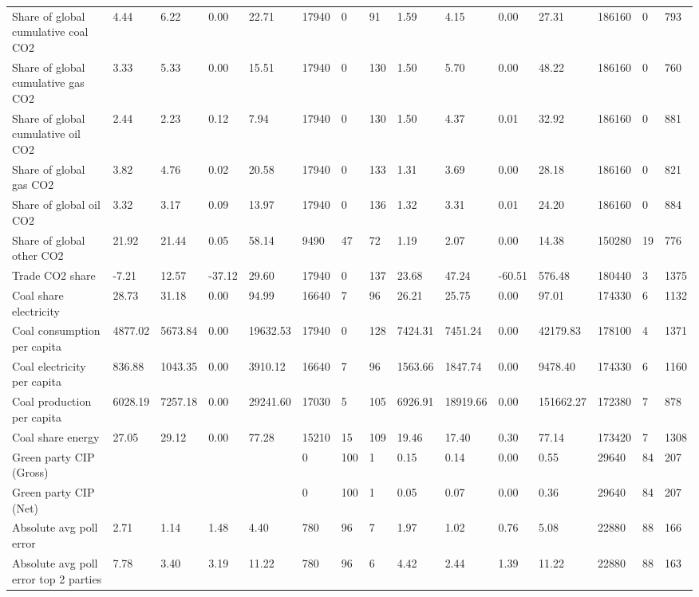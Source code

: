 \begin{longtable}{lllllllllllllll}
Share of global cumulative coal CO2 & 4.44 & 6.22 & 0.00 & 22.71 & 17940 & 0 & 91 & 1.59 & 4.15 & 0.00 & 27.31 & 186160 & 0 & 793\\
Share of global cumulative gas CO2 & 3.33 & 5.33 & 0.00 & 15.51 & 17940 & 0 & 130 & 1.50 & 5.70 & 0.00 & 48.22 & 186160 & 0 & 760\\
Share of global cumulative oil CO2 & 2.44 & 2.23 & 0.12 & 7.94 & 17940 & 0 & 130 & 1.50 & 4.37 & 0.01 & 32.92 & 186160 & 0 & 881\\
\addlinespace
Share of global gas CO2 & 3.82 & 4.76 & 0.02 & 20.58 & 17940 & 0 & 133 & 1.31 & 3.69 & 0.00 & 28.18 & 186160 & 0 & 821\\
Share of global oil CO2 & 3.32 & 3.17 & 0.09 & 13.97 & 17940 & 0 & 136 & 1.32 & 3.31 & 0.01 & 24.20 & 186160 & 0 & 884\\
Share of global other CO2 & 21.92 & 21.44 & 0.05 & 58.14 & 9490 & 47 & 72 & 1.19 & 2.07 & 0.00 & 14.38 & 150280 & 19 & 776\\
Trade CO2 share & -7.21 & 12.57 & -37.12 & 29.60 & 17940 & 0 & 137 & 23.68 & 47.24 & -60.51 & 576.48 & 180440 & 3 & 1375\\
Coal share electricity & 28.73 & 31.18 & 0.00 & 94.99 & 16640 & 7 & 96 & 26.21 & 25.75 & 0.00 & 97.01 & 174330 & 6 & 1132\\
\addlinespace
Coal consumption per capita & 4877.02 & 5673.84 & 0.00 & 19632.53 & 17940 & 0 & 128 & 7424.31 & 7451.24 & 0.00 & 42179.83 & 178100 & 4 & 1371\\
Coal electricity per capita & 836.88 & 1043.35 & 0.00 & 3910.12 & 16640 & 7 & 96 & 1563.66 & 1847.74 & 0.00 & 9478.40 & 174330 & 6 & 1160\\
Coal production per capita & 6028.19 & 7257.18 & 0.00 & 29241.60 & 17030 & 5 & 105 & 6926.91 & 18919.66 & 0.00 & 151662.27 & 172380 & 7 & 878\\
Coal share energy & 27.05 & 29.12 & 0.00 & 77.28 & 15210 & 15 & 109 & 19.46 & 17.40 & 0.30 & 77.14 & 173420 & 7 & 1308\\
Green party CIP (Gross) &  &  &  &  & 0 & 100 & 1 & 0.15 & 0.14 & 0.00 & 0.55 & 29640 & 84 & 207\\
\addlinespace
Green party CIP (Net) &  &  &  &  & 0 & 100 & 1 & 0.05 & 0.07 & 0.00 & 0.36 & 29640 & 84 & 207\\
Absolute avg poll error & 2.71 & 1.14 & 1.48 & 4.40 & 780 & 96 & 7 & 1.97 & 1.02 & 0.76 & 5.08 & 22880 & 88 & 166\\
Absolute avg poll error top 2 parties & 7.78 & 3.40 & 3.19 & 11.22 & 780 & 96 & 6 & 4.42 & 2.44 & 1.39 & 11.22 & 22880 & 88 & 163\\

\end{longtable}
